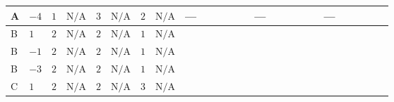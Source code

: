 \documentclass[8pt]{article}
\begin{document}
\begin{landscape}
\begin{longtable}{@{}llcccccc >{\raggedright\arraybackslash}p{0.21\linewidth} >{\raggedright\arraybackslash}p{0.21\linewidth} >{\raggedright\arraybackslash}p{0.21\linewidth}@{}}
\midrule
A & $-4$ & $1$ & $\text{N/A}$ & $3$ & $\text{N/A}$ & $2$ & $\text{N/A}$ & --- & --- & --- \\
\midrule
B & $1$ & $2$ & $\text{N/A}$ & $2$ & $\text{N/A}$ & $1$ & $\text{N/A}$ & \scriptsize\adjustbox{max width=\linewidth}{$\begin{gathered} +{g_1}^2 \left(\frac{27 {g_2}^2}{2}-27 {\lambda_{S_2}^{(1)}}\right)\end{gathered}$} & \scriptsize\adjustbox{max width=\linewidth}{$\begin{gathered} +\frac{243 {g_1}^4}{4}\end{gathered}$} & \scriptsize\adjustbox{max width=\linewidth}{$\begin{gathered} +\frac{{\lambda_{12}^{(A)}}^2}{4}\end{gathered}$} \\
\midrule
B & $-1$ & $2$ & $\text{N/A}$ & $2$ & $\text{N/A}$ & $1$ & $\text{N/A}$ & \scriptsize\adjustbox{max width=\linewidth}{$\begin{gathered} +{g_1}^2 \left(\frac{3 {g_2}^2}{2}-3 {\lambda_{S_2}^{(1)}}\right)\end{gathered}$} & \scriptsize\adjustbox{max width=\linewidth}{$\begin{gathered} +\frac{3 {g_1}^4}{4}\end{gathered}$} & \scriptsize\adjustbox{max width=\linewidth}{$\begin{gathered} +\frac{{\lambda_{12}^{(A)}}^2}{4}\end{gathered}$} \\
\midrule
B & $-3$ & $2$ & $\text{N/A}$ & $2$ & $\text{N/A}$ & $1$ & $\text{N/A}$ & \scriptsize\adjustbox{max width=\linewidth}{$\begin{gathered} +{g_1}^2 \left(\frac{3 {g_2}^2}{2}-3 {\lambda_{S_2}^{(1)}}\right)\end{gathered}$} & \scriptsize\adjustbox{max width=\linewidth}{$\begin{gathered} +\frac{3 {g_1}^4}{4}\end{gathered}$} & \scriptsize\adjustbox{max width=\linewidth}{$\begin{gathered} +\frac{{\lambda_{12}^{(A)}}^2}{4}\end{gathered}$} \\
\midrule
C & $1$ & $2$ & $\text{N/A}$ & $2$ & $\text{N/A}$ & $3$ & $\text{N/A}$ & \scriptsize\adjustbox{max width=\linewidth}{$\begin{gathered} +{g_1}^2 \left(\frac{27 {g_2}^2}{2}-27 {\lambda_{S_2}^{(1)}}\right)\end{gathered}$} & \scriptsize\adjustbox{max width=\linewidth}{$\begin{gathered} +\frac{243 {g_1}^4}{4}\end{gathered}$} & \scriptsize\adjustbox{max width=\linewidth}{$\begin{gathered} +\frac{{\lambda_{12}^{(A)}}^2}{4}\end{gathered}$} \\

\end{longtable}
\end{landscape}
\end{document}
